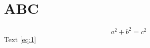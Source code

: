 \documentclass [a4paper, 11pt, openany]  {memoir}
\begin{document}
\section{ABC}
\begin{equation}
 a^2+b^2=c^2\label{eq:1}
\end{equation}
Text \eqref{eq:1}
\end{document}

